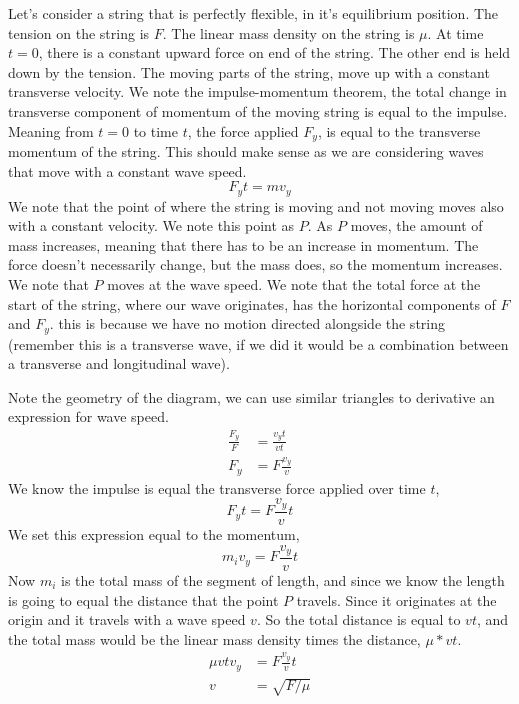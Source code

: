 Let's consider a string that is perfectly flexible, in it's equilibrium position. The tension on the string is $F$. The linear mass density on the string is $\mu$. At time $t=0$, there is a constant upward force on end of the string. The other end is held down by the tension. 
The moving parts of the string, move up with a constant transverse velocity. We note the impulse-momentum theorem, the total change in transverse component of momentum of the moving string is equal to the impulse. Meaning from $t=0$ to time $t$, the force applied $F_y$, is equal to the transverse momentum of the string. This should make sense as we are considering waves that move with a constant wave speed. 
\begin{equation*}
	F_yt = mv_y
\end{equation*}
We note that the point of where the string is moving and not moving moves also with a constant velocity. We note this point as $P$. As $P$ moves, the amount of mass increases, meaning that there has to be an increase in momentum. The force doesn't necessarily change, but the mass does, so the momentum increases. We note that $P$ moves at the wave speed. We note that the total force at the start of the string, where our wave originates, has the horizontal components of $F$ and $F_y$. this is because we have no motion directed alongside the string (remember this is a transverse wave, if we did it would be a combination between a transverse and longitudinal wave). 

Note the geometry of the diagram, we can use similar triangles to derivative an expression for wave speed. 
\begin{align*}
	\frac{F_y}{F} &= \frac{v_yt}{vt} \\ 
	F_y &= F\frac{v_y}{v}
\end{align*}
We know the impulse is equal the transverse force applied over time $t$, 
\begin{equation*}
	F_yt = F\frac{v_y}{v}t
\end{equation*}
We set this expression equal to the momentum,
\begin{equation*}
	m_iv_y = F\frac{v_y}{v}t
\end{equation*}
Now $m_i$ is the total mass of the segment of length, and since we know the length is going to equal the distance that the point $P$ travels. Since it originates at the origin and it travels with a wave speed $v$. So the total distance is equal to $vt$, and the total mass would be the linear mass density times the distance, $\mu*vt$.
\begin{align*}
	\mu vtv_y &= F\frac{v_y}{v}t \\ 
	v &= 	\sqrt{F/\mu}  
\end{align*}


